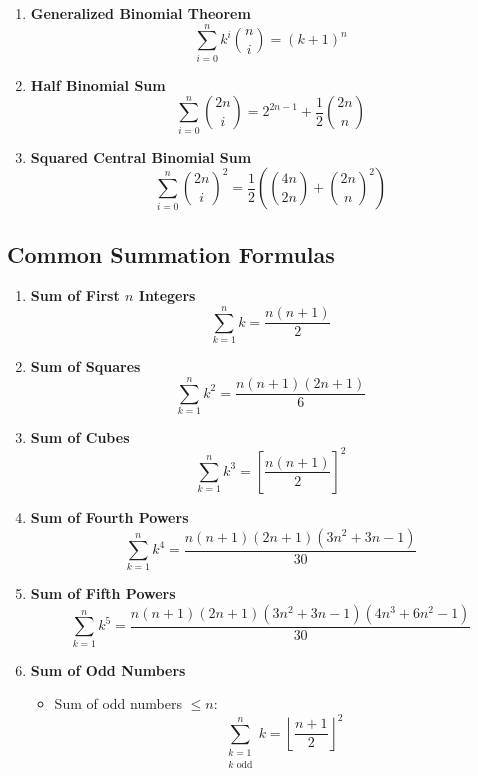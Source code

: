 \documentclass[twoside]{article}
\begin{document}
\begin{multicols*}{2}
\begin{enumerate}[leftmargin=*]
    \item \textbf{Generalized Binomial Theorem}
        \[\sum_{i=0}^n k^i\binom{n}{i} = (k+1)^n\]
    
    \item \textbf{Half Binomial Sum}
        \[\sum_{i=0}^n \binom{2n}{i} = 2^{2n-1} + \frac{1}{2}\binom{2n}{n}\]
    
    \item \textbf{Squared Central Binomial Sum}
        \[\sum_{i=0}^n \binom{2n}{i}^2 = \frac{1}{2}\left(\binom{4n}{2n} + \binom{2n}{n}^2\right)\]
\end{enumerate}

{
\subsection*{Common Summation Formulas}
}
\begin{enumerate}[leftmargin=*]
    \item \textbf{Sum of First $n$ Integers}
        \[\sum_{k = 1}^n k = \frac{n(n + 1)}{2}\]
    
    \item \textbf{Sum of Squares}
        \[\sum_{k = 1}^n k^2 = \frac{n(n + 1)(2n + 1)}{6}\]
    
    \item \textbf{Sum of Cubes}
        \[\sum_{k = 1}^n k^3 = \left[\frac{n(n + 1)}{2}\right]^2\]
    
    \item \textbf{Sum of Fourth Powers}
        \[\sum_{k = 1}^n k^4 = \frac{n(n + 1)(2n + 1)(3n^2 + 3n - 1)}{30}\]
    
    \item \textbf{Sum of Fifth Powers}
        \[\sum_{k = 1}^n k^5 = \frac{n(n + 1)(2n + 1)(3n^2 + 3n - 1)(4n^3 + 6n^2 - 1)}{30}\]
    
    \item \textbf{Sum of Odd Numbers}
        \begin{itemize}
            \item Sum of odd numbers $\leq n$:
            \[\sum_{\substack{k = 1 \\ k\text{ odd}}}^n k = \left\lfloor \frac{n + 1}{2} \right\rfloor^2\]
        \end{itemize}
    

\end{enumerate}
\end{multicols*}
\end{document}
